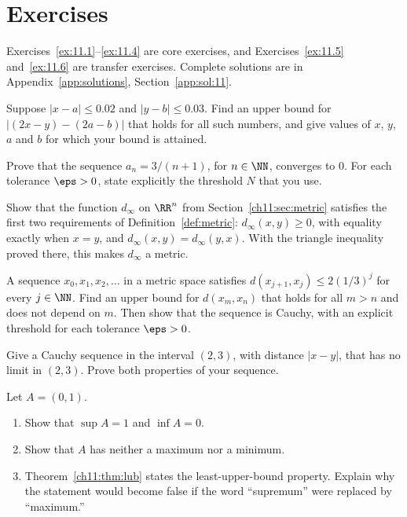 \section*{Exercises}
Exercises~\ref{ex:11.1}--\ref{ex:11.4} are core exercises, and Exercises~\ref{ex:11.5} and~\ref{ex:11.6} are transfer exercises. Complete solutions are in Appendix~\ref{app:solutions}, Section~\ref{app:sol:11}.
\begin{exercise}\label{ex:11.1}Suppose $|x-a|\le0.02$ and $|y-b|\le0.03$. Find an upper bound for $|(2x-y)-(2a-b)|$ that holds for all such numbers, and give values of $x$, $y$, $a$ and $b$ for which your bound is attained.\end{exercise}
\begin{exercise}\label{ex:11.2}Prove that the sequence $a_n=3/(n+1)$, for $n\in\NN$, converges to $0$. For each tolerance $\eps>0$, state explicitly the threshold $N$ that you use.\end{exercise}
\begin{exercise}\label{ex:11.3}Show that the function $d_\infty$ on $\RR^n$ from Section~\ref{ch11:sec:metric} satisfies the first two requirements of Definition~\ref{def:metric}: $d_\infty(x,y)\ge0$, with equality exactly when $x=y$, and $d_\infty(x,y)=d_\infty(y,x)$. With the triangle inequality proved there, this makes $d_\infty$ a metric.\end{exercise}
\begin{exercise}\label{ex:11.4}A sequence $x_0,x_1,x_2,\ldots$ in a metric space satisfies $d(x_{j+1},x_j)\le2(1/3)^j$ for every $j\in\NN$. Find an upper bound for $d(x_m,x_n)$ that holds for all $m>n$ and does not depend on $m$. Then show that the sequence is Cauchy, with an explicit threshold for each tolerance $\eps>0$.\end{exercise}
\begin{exercise}\label{ex:11.5}Give a Cauchy sequence in the interval $(2,3)$, with distance $|x-y|$, that has no limit in $(2,3)$. Prove both properties of your sequence.\end{exercise}
\begin{exercise}\label{ex:11.6}Let $A=(0,1)$.
\begin{enumerate}
\item Show that $\sup A=1$ and $\inf A=0$.
\item Show that $A$ has neither a maximum nor a minimum.
\item Theorem~\ref{ch11:thm:lub} states the least-upper-bound property. Explain why the statement would become false if the word ``supremum'' were replaced by ``maximum.''
\end{enumerate}
\end{exercise}
